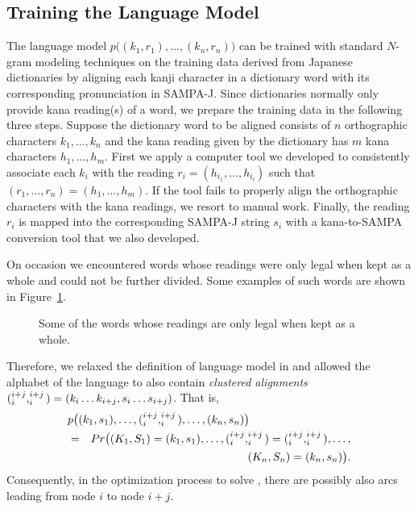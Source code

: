 \subsection{Training the Language Model}
\label{lm}

The language model $p\big((k_1,r_1),\dots,(k_n,r_n)\big)$ can be
trained with standard $N$-gram modeling techniques on the training
data derived from Japanese dictionaries by aligning each kanji
character in a dictionary word with its corresponding
pronunciation in SAMPA-J. Since dictionaries normally only provide
kana reading(s) of a word, we prepare the training data in the
following three steps. Suppose the dictionary word to be aligned
consists of $n$ orthographic characters $k_1,\ldots, k_n$ and the
kana reading given by the dictionary has $m$ kana characters
$h_1,\ldots, h_m$. First we apply a computer tool we developed to
consistently associate each $k_i$ with the reading
$r_i=(h_{i_1},\ldots,h_{i_l})$ such that
$(r_1,\ldots,r_n)=(h_1,\ldots, h_m)$. If the tool fails to
properly align the orthographic characters with the kana readings,
we resort to manual work. Finally, the reading $r_i$ is mapped
into the corresponding SAMPA-J string $s_i$ with a kana-to-SAMPA
conversion tool that we also developed.

On occasion we encountered words whose readings were only legal
when kept as a whole and could not be further divided. Some
examples of such words are shown in Figure~\ref{cluster}.
\begin{figure}
\begin{center}

\end{center}
\caption{Some of the words whose readings are only legal when kept
as a whole.} \label{cluster}
\end{figure}
Therefore, we relaxed the definition of language model in
 and allowed the alphabet of the language to
also contain {\it clustered alignments} $(_i^{i+j},
_i^{i+j}) = (k_i \ldots k_{i+j}, s_i \ldots s_{i+j})$. That is,
\begin{eqnarray*}
\lefteqn{p\big((k_1,s_1),\dots,(\bk_i^{i+j}, \bs_i^{i+j})
,\ldots,(k_n,s_n)\big)} \\
& = & Pr\big((K_1,S_1)=(k_1,s_1),\ldots,(\bK_i^{i+j},
\bS_i^{i+j})=
(\bk_i^{i+j}, \bs_i^{i+j}), \ldots, \\
& & (K_n,S_n)=(k_n,s_n)\big).
\end{eqnarray*}
Consequently, in the optimization process to solve
, there are possibly also arcs leading from node
$i$ to node $i+j$.


